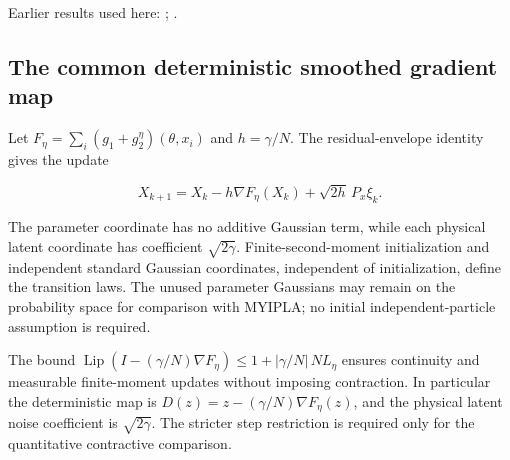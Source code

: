 \documentclass[11pt,a4paper]{report}
\begin{document}
Earlier results used here: \cite[Section~3.20.1]{LangevinLean2026ULASC}; \cite[Section~3.1.1]{LangevinLean2026IPLA}.
\subsection{\texorpdfstring{The common deterministic smoothed gradient map}{The common deterministic smoothed gradient map}}
\label{report-step-ProximalLangevin-MYPGDAlgorithm-lean-2}


Let \(F_\eta=\sum_i(g_1+g_2^\eta)(\theta,x_i)\) and \(h=\gamma/N\). The residual-envelope identity gives the update

\[
X_{k+1}=X_k-h\nabla F_\eta(X_k)+\sqrt{2h}\,P_x\xi_k.
\]

The parameter coordinate has no additive Gaussian term, while each physical latent coordinate has coefficient \(\sqrt{2\gamma}\). Finite-second-moment initialization and independent standard Gaussian coordinates, independent of initialization, define the transition laws. The unused parameter Gaussians may remain on the probability space for comparison with MYIPLA; no initial independent-particle assumption is required.



The bound \(\operatorname{Lip}(I-(\gamma/N)\nabla F_\eta)\le1+|\gamma/N|\,NL_\eta\) ensures continuity and measurable finite-moment updates without imposing contraction. In particular the deterministic map is \(D(z)=z-(\gamma/N)\nabla F_\eta(z)\), and the physical latent noise coefficient is \(\sqrt{2\gamma}\). The stricter step restriction is required only for the quantitative contractive comparison.
\end{document}
